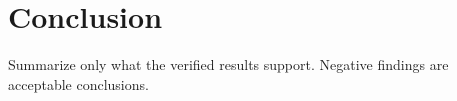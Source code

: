 \section{Conclusion}
\label{sec:conclusion}
Summarize only what the verified results support. Negative findings are acceptable conclusions.
